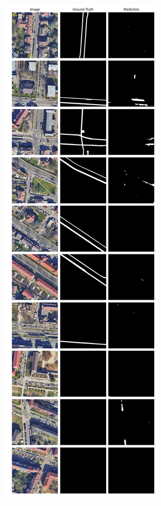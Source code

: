 \begin{figure}
	\centering
	\begin{subfigure}{.4\textwidth}
		\centering
		\includegraphics[width=1.\textwidth]{Bilder/Samples-KA/bunet2-l.png} 

\end{subfigure}
\end{figure}
